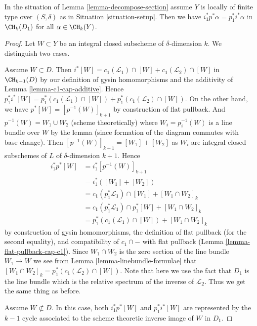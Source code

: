 \begin{lemma}
\label{lemma-decompose-section-formulae}
In the situation of Lemma \ref{lemma-decompose-section}
assume $Y$ is locally of finite type over $(S, \delta)$ as in
Situation \ref{situation-setup}. Then we have
$i_1^*p^*\alpha = p_1^*i^*\alpha$
in $\CH_k(D_1)$ for all $\alpha \in \CH_k(Y)$.
\end{lemma}

\begin{proof}
Let $W \subset Y$ be an integral closed subscheme of $\delta$-dimension $k$.
We distinguish two cases.

\medskip\noindent
Assume $W \subset D$. Then
$i^*[W] = c_1(\mathcal{L}_1) \cap [W] + c_1(\mathcal{L}_2) \cap [W]$
in $\CH_{k - 1}(D)$ by our definition of gysin homomorphisms and the
additivity of Lemma \ref{lemma-c1-cap-additive}.
Hence $p_1^*i^*[W] =
p_1^*(c_1(\mathcal{L}_1) \cap [W]) + p_1^*(c_1(\mathcal{L}_2) \cap [W])$.
On the other hand, we have
$p^*[W] = [p^{-1}(W)]_{k + 1}$ by construction of flat pullback.
And $p^{-1}(W) = W_1 \cup W_2$ (scheme theoretically)
where $W_i = p_i^{-1}(W)$ is a line bundle over $W$
by the lemma (since formation of the diagram commutes with base change).
Then $[p^{-1}(W)]_{k + 1} = [W_1] + [W_2]$ as $W_i$ are integral closed
subschemes of $L$ of $\delta$-dimension $k + 1$. Hence
\begin{align*}
i_1^*p^*[W]
& =
i_1^*[p^{-1}(W)]_{k + 1} \\
& =
i_1^*([W_1] + [W_2]) \\
& =
c_1(p_1^*\mathcal{L}_1) \cap [W_1] + [W_1 \cap W_2]_k \\
& =
c_1(p_1^*\mathcal{L}_1) \cap p_1^*[W] + [W_1 \cap W_2]_k \\
& =
p_1^*(c_1(\mathcal{L}_1) \cap [W]) + [W_1 \cap W_2]_k
\end{align*}
by construction of gysin homomorphisms, the definition of flat pullback
(for the second equality), and compatibility of $c_1 \cap -$
with flat pullback (Lemma \ref{lemma-flat-pullback-cap-c1}).
Since $W_1 \cap W_2$ is the zero section of the line bundle
$W_1 \to W$ we see from Lemma \ref{lemma-linebundle-formulae}
that $[W_1 \cap W_2]_k = p_1^*(c_1(\mathcal{L}_2) \cap [W])$.
Note that here we use the fact that $D_1$ is the line bundle
which is the relative spectrum of the inverse of $\mathcal{L}_2$.
Thus we get the same thing as before.

\medskip\noindent
Assume $W \not \subset D$. In this case, both $i_1^*p^*[W]$
and $p_1^*i^*[W]$ are represented by the $k - 1$ cycle associated
to the scheme theoretic inverse image of $W$ in $D_1$.
\end{proof}

